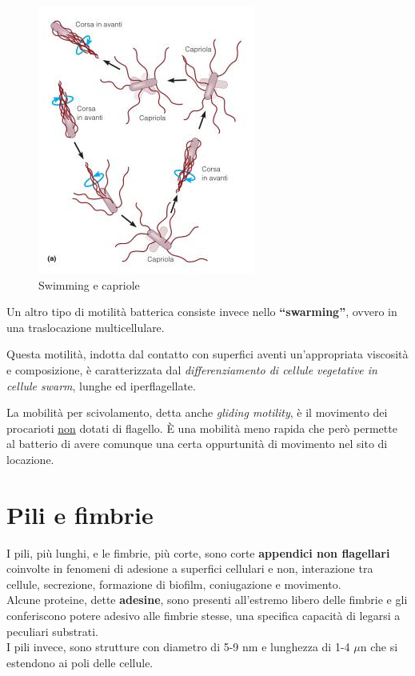 \documentclass[11pt]{book}
\begin{document}
\clearpage
\begin{figure}[htp]
\centering
\includegraphics[scale=0.6]{img/Swimming e capriole.png}
\caption{Swimming e capriole}
\label{}
\end{figure}

Un altro tipo di motilità batterica  consiste invece nello \textbf{``swarming''}, ovvero in una traslocazione multicellulare.

Questa motilità, indotta dal contatto con superfici aventi un'appropriata viscosità e composizione, è caratterizzata dal \emph{differenziamento di cellule vegetative in cellule swarm}, lunghe ed iperflagellate.

La mobilità per scivolamento, detta anche \emph{gliding motility}, è il movimento dei procarioti \underline{non} dotati di flagello.
\`E una mobilità meno rapida che però permette al batterio di avere comunque una certa oppurtunità di movimento nel sito di locazione.


\section{Pili e fimbrie}
I pili, più lunghi, e le fimbrie, più corte, sono corte \textbf{appendici non flagellari} coinvolte in fenomeni di adesione a superfici cellulari e non, interazione tra cellule, secrezione, formazione di biofilm, coniugazione e movimento.\\
Alcune proteine, dette \textbf{adesine}, sono presenti all'estremo libero delle fimbrie e gli conferiscono potere adesivo alle fimbrie stesse, una specifica capacità di legarsi a peculiari substrati.\\
I pili invece, sono strutture con diametro di 5-9 nm e lunghezza di 1-4 $\mu$n che si estendono ai poli delle cellule.
\end{document}
